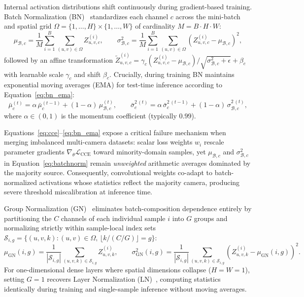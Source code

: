Internal activation distributions shift continuously during gradient-based training. Batch Normalization (BN)~\cite{ioffe2015batch} standardizes each channel $c$ across the mini-batch and spatial grid $\Omega = \{1, \dots, H\} \times \{1, \dots, W\}$ of cardinality $M = B \cdot H \cdot W$:
\begin{equation}
\label{eq:batchnorm}
    \mu_{\mathcal{B}, c} = \frac{1}{M} \sum_{i=1}^{B} \sum_{(u,v) \in \Omega} Z^{(i)}_{u,v,c}, \qquad
    \sigma^2_{\mathcal{B}, c} = \frac{1}{M} \sum_{i=1}^{B} \sum_{(u,v) \in \Omega} \left(Z^{(i)}_{u,v,c} - \mu_{\mathcal{B}, c}\right)^2,
\end{equation}
followed by an affine transformation $\tilde{Z}^{(i)}_{u,v,c} = \gamma_c (Z^{(i)}_{u,v,c} - \mu_{\mathcal{B}, c}) / \sqrt{\sigma^2_{\mathcal{B}, c} + \epsilon} + \beta_c$ with learnable scale $\gamma_c$ and shift $\beta_c$. Crucially, during training BN maintains exponential moving averages (EMA) for test-time inference according to Equation~\eqref{eq:bn_ema}:
\begin{equation}
\label{eq:bn_ema}
    \bar{\mu}_c^{(t)} = \alpha \, \bar{\mu}_c^{(t-1)} + (1 - \alpha)\, \mu_{\mathcal{B}, c}^{(t)}, \qquad
    \bar{\sigma}_c^{2\,(t)} = \alpha \, \bar{\sigma}_c^{2\,(t-1)} + (1 - \alpha)\, \sigma_{\mathcal{B}, c}^{2\,(t)},
\end{equation}
where $\alpha \in (0, 1)$ is the momentum coefficient (typically $0.99$).

Equations~\eqref{eq:cce}--\eqref{eq:bn_ema} expose a critical failure mechanism when merging imbalanced multi-camera datasets: scalar loss weights $w_i$ rescale parameter gradients $\nabla_\theta \mathcal{L}_{\text{CCE}}$ toward minority-domain samples, yet $\mu_{\mathcal{B}, c}$ and $\sigma^2_{\mathcal{B}, c}$ in Equation~\eqref{eq:batchnorm} remain \emph{unweighted} arithmetic averages dominated by the majority source. Consequently, convolutional weights co-adapt to batch-normalized activations whose statistics reflect the majority camera, producing severe threshold miscalibration at inference time.

Group Normalization (GN)~\cite{wu2018group} eliminates batch-composition dependence entirely by partitioning the $C$ channels of each individual sample $i$ into $G$ groups and normalizing strictly within sample-local index sets $\mathcal{S}_{i, g} = \{(u, v, k) : (u, v) \in \Omega,\, \lfloor k / (C/G) \rfloor = g\}$:
\begin{equation}
\label{eq:groupnorm}
    \mu_{\text{GN}}(i, g) = \frac{1}{|\mathcal{S}_{i,g}|} \sum_{(u,v,k) \in \mathcal{S}_{i,g}} Z^{(i)}_{u,v,k}, \qquad
    \sigma^2_{\text{GN}}(i, g) = \frac{1}{|\mathcal{S}_{i,g}|} \sum_{(u,v,k) \in \mathcal{S}_{i,g}} \left(Z^{(i)}_{u,v,k} - \mu_{\text{GN}}(i, g)\right)^2.
\end{equation}
For one-dimensional dense layers where spatial dimensions collapse ($H=W=1$), setting $G=1$ recovers Layer Normalization (LN)~\cite{ba2016layer}, computing statistics identically during training and single-sample inference without moving averages.

